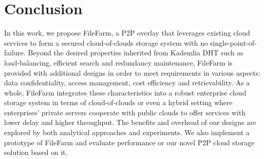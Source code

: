 \chapter{Conclusion}
\label{c:conclusion}

In this work, we propose FileFarm, a P2P overlay that leverages existing cloud services to form a secured cloud-of-clouds storage system with no single-point-of-failure. Beyond the desired properties inherited from Kademlia DHT such as load-balancing, efficient search and redundancy maintenance, FileFarm is provided with additional designs in order to meet requirements in various aspects: data confidentiality, access management, cost efficiency and retrievability. As a whole, FileFarm integrates these characteristics into a robust enterprise cloud storage system in terms of cloud-of-clouds or even a hybrid setting where enterprises' private servers cooperate with public clouds to offer services with lower delay and higher throughput. The benefits and overhead of our designs are explored by both analytical approaches and experiments. We also implement a prototype of FileFarm and evaluate performance or our novel P2P cloud storage solution based on it.
